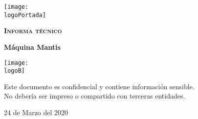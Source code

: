 \documentclass[a4paper]{article}
\newcommand{\logoPortada}{../icons/profile.png}
\newcommand{\nombrePortada}{Mantis}
\newcommand{\logoB}{../icons/profile.png}
\newcommand{\datetime}{24 de Marzo del 2020}
\begin{document}
	\begin{titlepage}
		\centering
		\texttt{[image: \\logoPortada]}\par\vspace{1cm}%
		{\scshape\LARGE \textbf{Informa técnico}\par}
		\vspace{0.2cm}
		{\Huge\bfseries\textcolor{greenPortada}{Máquina \nombrePortada}\par}
		\vfill\vfill
		\texttt{[image: \\logoB]}\par\vspace{1cm}
		\vfill
		\begin{tcolorbox}[colback=red!5!white,colframe=red!75!black]
			\centering
			Este documento es confidencial y contiene información sensible.
			\\
			No debería ser impreso o compartido con terceras entidades.
		\end{tcolorbox}
		\vfill
		{\large \datetime\par}
		\vfill
	\end{titlepage}
\end{document}
